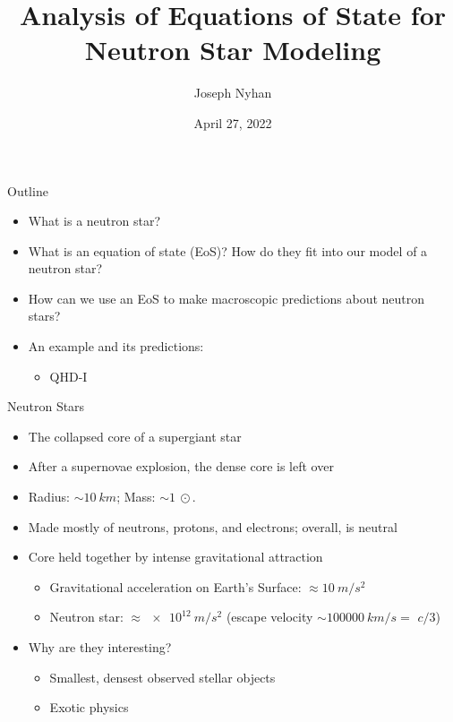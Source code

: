 \documentclass[]{beamer}
\title[Analysis of Equations of State]{Analysis of Equations of State for Neutron Star Modeling}
\author{Joseph Nyhan}
\date{April 27, 2022}
\institute{College of the Holy Cross}
\begin{document}
    \maketitle

    \begin{frame}{Outline}
        \pause
        \begin{itemize}
            \item What is a neutron star? \pause
            \item What is an equation of state (EoS)? \pause How do they fit into our model of a neutron star? \pause
            \item How can we use an EoS to make macroscopic predictions about neutron stars? \pause
            \item An example and its predictions: \pause
            \begin{itemize}
                \item QHD-I
            \end{itemize}
        \end{itemize}
    \end{frame}

    \begin{frame}{Neutron Stars}
        \pause
        \begin{itemize}
            \item The collapsed core of a supergiant star \pause
            \item After a supernovae explosion, the dense core is left over \pause
            \item Radius: $\sim\SI{10}{km}$\pause ; Mass: $\sim\SI{1}{\odot}$. \pause
            \item Made mostly of neutrons, protons, and electrons\pause ; overall, is neutral \pause
            \item Core held together by intense gravitational attraction \pause
            \begin{itemize}
                \item Gravitational acceleration on Earth's Surface: $\approx \SI{10}{m/s^2}$ \pause
                \item Neutron star: $\approx \SI{e12}{m/s^2}$ \pause (escape velocity $\sim \SI{100000}{km/s} = $ \pause $c/3$)\pause
            \end{itemize}
            \item Why are they interesting? \pause \begin{itemize}
                \item Smallest, densest observed stellar objects \pause
                \item Exotic physics
            \end{itemize}
        \end{itemize}
    \end{frame}
\end{document}
